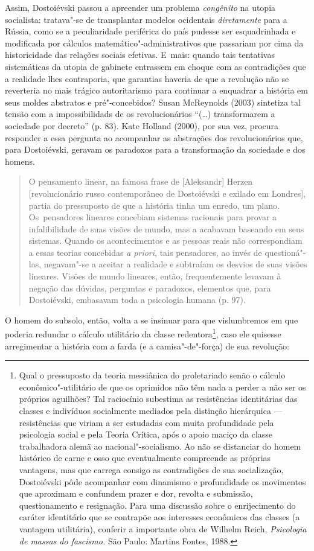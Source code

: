 Assim, Dostoiévski passou a apreender um problema \emph{congênito} na
utopia socialista: tratava"-se de transplantar modelos ocidentais
\emph{diretamente} para a Rússia, como se a peculiaridade periférica do
país pudesse ser esquadrinhada e modificada por cálculos
matemático"-administrativos que passariam por cima da historicidade das
relações sociais efetivas. E~mais: quando tais tentativas sistemáticas
da utopia de gabinete entrassem em choque com as contradições que a
realidade lhes contraporia, que garantias haveria de que a revolução não
se reverteria no mais trágico autoritarismo para continuar a enquadrar a
história em seus moldes abstratos e pré"-concebidos? Susan McReynolds
(2003) sintetiza tal tensão com a impossibilidads de os revolucionários
``(\ldots) transformarem a sociedade por decreto'' (p. 83). Kate Holland
(2000), por sua vez, procura responder a essa pergunta ao acompanhar as
abstrações dos revolucionários que, para Dostoiévski, geravam os
paradoxos para a transformação da sociedade e dos homens.

\begin{quote}
O pensamento linear, na famosa frase de {[}Aleksandr{]} Herzen
{[}revolucionário russo contemporâneo de Dostoiévski e exilado em
Londres{]}, partia do pressuposto de que a história tinha um enredo, um
plano. Os~pensadores lineares concebiam sistemas racionais para provar a
infalibilidade de suas visões de mundo, mas a acabavam baseando em seus
sistemas. Quando os acontecimentos e as pessoas reais não correspondiam
a essas teorias concebidas \emph{a priori}, tais pensadores, ao invés de
questioná"-las, negavam"-se a aceitar a realidade e subtraíam os desvios
de suas visões lineares. Visões de mundo lineares, então, frequentemente
levavam à negação das dúvidas, perguntas e paradoxos, elementos que,
para Dostoiévski, embasavam toda a psicologia humana (p. 97).
\end{quote}

O homem do subsolo, então, volta a se insinuar para que vislumbremos em
que poderia redundar o cálculo utilitário da classe redentora\footnote{Qual
  o pressuposto da teoria messiânica do proletariado senão o cálculo
  econômico"-utilitário de que os oprimidos não têm nada a perder a não
  ser os próprios aguilhões? Tal raciocínio subestima as resistências
  identitárias das classes e indivíduos socialmente mediados pela
  distinção hierárquica --- resistências que viriam a ser estudadas com
  muita profundidade pela psicologia social e pela Teoria Crítica, após
  o apoio maciço da classe trabalhadora alemã ao nacional"-socialismo. Ao
  não se distanciar do homem histórico de carne e osso que eventualmente
  compreende as próprias vantagens, mas que carrega consigo as
  contradições de sua socialização, Dostoiévski pôde acompanhar com
  dinamismo e profundidade os movimentos que aproximam e confundem
  prazer e dor, revolta e submissão, questionamento e resignação. Para
  uma discussão sobre o enrijecimento do caráter identitário que se
  contrapõe aos interesses econômicos das classes (a vantagem
  utilitária), conferir a importante obra de Wilhelm Reich,
  \emph{Psicologia de massas do fascismo.} São Paulo: Martins Fontes,
  1988.}, caso ele quisesse arregimentar a história com a farda (e a
camisa"-de"-força) de sua revolução:

